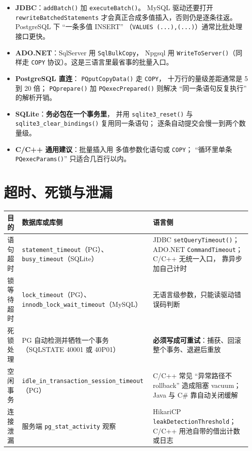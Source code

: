 \documentclass[12pt,a4paper,fontset=fandol]{ctexbook}
\newcommand{\Fn}[1]{\texttt{#1()}}
\newcommand{\Tp}[1]{\texttt{#1}}
\newcommand{\CSharp}{C\#}
\newcommand{\CppJava}{C/C++}
\begin{document}
\begin{itemize}
  \item \textbf{JDBC}：\Fn{addBatch} 加 \Fn{executeBatch}。
        MySQL 驱动还要打开
        \Tp{rewrite\allowbreak Batched\allowbreak Statements}
        才会真正合成多值插入，否则仍是逐条往返。
        PostgreSQL 下 ``一条多值 INSERT''
        （\texttt{VALUES (...),\allowbreak (...)}）通常比批处理接口更快。
  \item \textbf{ADO.NET}：SqlServer 用 \Tp{SqlBulkCopy}，
        Npgsql 用 \Fn{WriteToServer}（同样走
        \texttt{COPY} 协议）。这是三语言里最省事的批量入口。
  \item \textbf{PostgreSQL 直连}：
        \Fn{PQputCopyData} 走 \texttt{COPY}，
        十万行的量级差距通常是 5 到 20 倍；
        \Fn{PQprepare} 加 \Fn{PQexecPrepared}
        则解决 ``同一条语句反复执行'' 的解析开销。
  \item \textbf{SQLite}：\textbf{务必包在一个事务里}，
        并用 \Fn{sqlite3\_reset} 与
        \Fn{sqlite3\_clear\_\allowbreak bindings} 复用同一条语句；
        逐条自动提交会慢一到两个数量级。
  \item \textbf{\CppJava{} 通用建议}：批量插入用
        多值参数化语句或 \texttt{COPY}；
        ``循环里单条 \Fn{PQexec\allowbreak{}Params}'' 只适合几百行以内。
\end{itemize}

\section{超时、死锁与泄漏}

\begin{footnotesize}
\begin{longtable}{@{}>{\raggedright\arraybackslash}p{}
                  >{\raggedright\arraybackslash}p{}
                  >{\raggedright\arraybackslash}p{}@{}}
\toprule
\textbf{目的} & \textbf{数据库或库侧} & \textbf{语言侧} \\
\midrule
语句超时 & \Tp{statement\_\allowbreak timeout}（PG）、
\Tp{busy\_timeout}（SQLite） &
JDBC \Fn{setQueryTimeout}；ADO.NET
\Tp{CommandTimeout}；\CppJava{} 无统一入口，
靠异步加自己计时 \\
\addlinespace
锁等待超时 & \Tp{lock\_timeout}（PG）、
\Tp{innodb\_lock\_\allowbreak wait\_\allowbreak timeout}（MySQL） &
无语言级参数，只能读驱动错误码判断 \\
\addlinespace
死锁处理 & PG 自动检测并牺牲一个事务（SQLSTATE 40001 或 40P01） &
\textbf{必须写成可重试}：捕获、回滚整个事务、退避后重放 \\
\addlinespace
空闲事务 & \Tp{idle\_in\_\allowbreak transaction\_\allowbreak session\_timeout}（PG） &
\CppJava{} 常见 ``异常路径不 rollback'' 造成阻塞 vacuum；
Java 与 \CSharp{} 靠自动关闭缓解 \\
\addlinespace
连接泄漏 & 服务端 \Tp{pg\_stat\_activity} 观察 &
HikariCP \Tp{leakDetectionThreshold}；
\CppJava{} 用池自带的借出计数或日志 \\
\bottomrule
\end{longtable}
\end{footnotesize}
\end{document}
